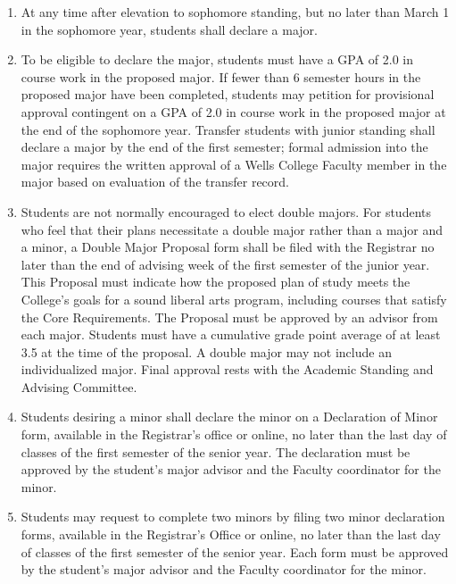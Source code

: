 \documentclass{manual}
\newcommand{\modified}[1]{}
\newcommand{\itemLevelA}{\alph*.}
\newcommand{\itemRefA}{\alph*}
\begin{document}
\begin{enumerate}[label=\itemLevelA,ref=\itemRefA]
\item At any time after elevation to sophomore standing, but no later than\modified{11/12/01} March 1 in the sophomore year, students shall declare a major.

\item To be eligible to declare the major, students must have a GPA of 2.0\modified{5/13/93} in course work in the proposed major. If fewer than 6 semester hours in the proposed major have been completed, students may petition for provisional approval contingent on a GPA of 2.0 in course work in the proposed major at the end of the sophomore year. Transfer students with junior standing shall declare a major by the end of the first semester; formal admission into the major requires the written approval of a Wells College Faculty member in the major based on evaluation of the transfer record.

\item Students are not normally encouraged to elect double majors. For students who feel \modified{10/17/00} that their plans necessitate a double major rather than a major and a minor,  a Double Major Proposal form shall be filed with the Registrar no later than the \modified{9/9/2003}
end of advising week of the first semester of the junior year. This Proposal must indicate how the proposed plan of study meets the College's goals for a sound liberal arts program, including courses that satisfy the Core Requirements. The Proposal must be approved by an advisor from each major. Students must have a cumulative grade point average of at least 3.5 at the time of the proposal. A double major may not include an individualized major. Final approval rests with the Academic Standing and Advising Committee.

\item Students desiring a minor shall declare the minor on a Declaration of Minor\modified{4/8/03} form, available in the Registrar's office or online, no later than\modified{5/08/12} the last day of classes of the first semester of the senior year. The declaration must be approved by the student's major advisor and the Faculty coordinator for the minor.

\item Students may request to complete two minors by filing two minor declaration forms, available in the Registrar's Office or online, no later than the last day of classes of the first semester of the senior year. Each form must be approved by the student's major advisor and the Faculty coordinator for the minor.
\end{enumerate}
\end{document}
